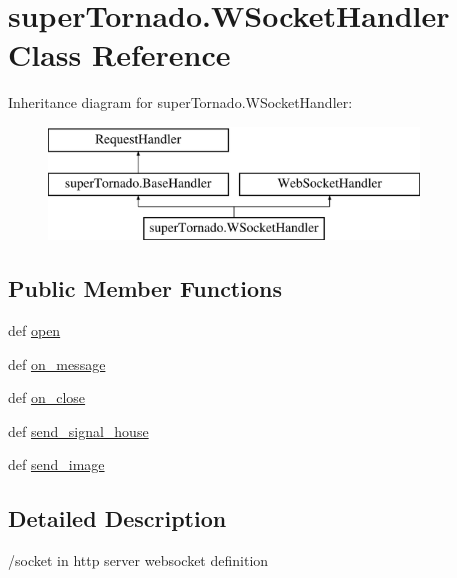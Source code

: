 \hypertarget{classsuper_tornado_1_1_w_socket_handler}{\section{super\-Tornado.\-W\-Socket\-Handler Class Reference}
\label{classsuper_tornado_1_1_w_socket_handler}
}
Inheritance diagram for super\-Tornado.\-W\-Socket\-Handler\-:\begin{figure}[H]
\begin{center}
\leavevmode
\includegraphics[height=3.000000cm]{classsuper_tornado_1_1_w_socket_handler}
\end{center}
\end{figure}
\subsection*{Public Member Functions}
\begin{DoxyCompactItemize}
\item 
def \hyperlink{classsuper_tornado_1_1_w_socket_handler_a93c6a7682da1900113bf2f0894b93fa2}{open}
\item 
def \hyperlink{classsuper_tornado_1_1_w_socket_handler_a4ef2fe7a6016b72f7d80c80260f2ceae}{on\-\_\-message}
\item 
def \hyperlink{classsuper_tornado_1_1_w_socket_handler_acd974cfb26b4f7461cb631407a7e3c1d}{on\-\_\-close}
\item 
def \hyperlink{classsuper_tornado_1_1_w_socket_handler_ae0ed9d69a6bb69cc74a394c8973fbbb8}{send\-\_\-signal\-\_\-house}
\item 
def \hyperlink{classsuper_tornado_1_1_w_socket_handler_a9a80cbbe4a4a87dd7eca485ec6b9e04b}{send\-\_\-image}
\end{DoxyCompactItemize}


\subsection{Detailed Description}
\begin{DoxyVerb}/socket in http server
websocket definition
\end{DoxyVerb}
 

